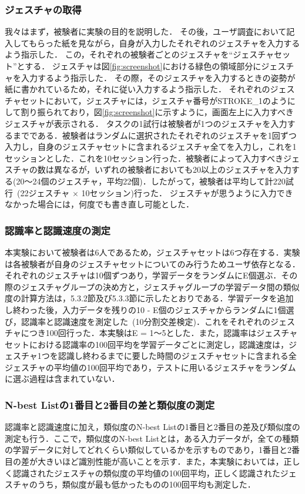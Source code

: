 \subsubsection{ジェスチャの取得}
我々はまず，被験者に実験の目的を説明した．
その後，ユーザ調査において記入してもらった紙を見ながら，自身が入力したそれぞれのジェスチャを入力するよう指示した．
この，それぞれの被験者ごとのジェスチャを``ジェスチャセット''とする．
ジェスチャは図\ref{fig:screenshot}における緑色の領域部分にジェスチャを入力するよう指示した．
その際，そのジェスチャを入力するときの姿勢が紙に書かれているため，それに従い入力するよう指示した．
それぞれのジェスチャセットにおいて，ジェスチャには，ジェスチャ番号がSTROKE\_1のようにして割り振られており，図\ref{fig:screenshot}に示すように，画面左上に入力すべきジェスチャが表示される．
タスクの1試行は被験者が1つのジェスチャを入力するまでである．被験者はランダムに選択されたそれぞれのジェスチャを1回ずつ入力し，自身のジェスチャセットに含まれるジェスチャ全てを入力し，これを1セッションとした．これを10セッション行った．被験者によって入力すべきジェスチャの数は異なるが，いずれの被験者においても20以上のジェスチャを入力する(20〜24個のジェスチャ，平均22個)．したがって，被験者は平均して計220試行~(22ジェスチャ $\times$ 10セッション)行った．
ジェスチャが思うように入力できなかった場合には，何度でも書き直し可能とした．

\subsubsection{認識率と認識速度の測定}
本実験において被験者は6人であるため，ジェスチャセットは6つ存在する．実験は各被験者が自身のジェスチャセットについてのみ行うためユーザ依存となる．それぞれのジェスチャは10個ずつあり，学習データをランダムにE個選ぶ．その際のジェスチャグループの決め方と，ジェスチャグループの学習データ間の類似度の計算方法は，5.3.2節及び5.3.3節に示したとおりである．学習データを追加し終わった後，入力データを残りの10 - E個のジェスチャからランダムに1個選び，認識率と認識速度を測定した~(10分割交差検定)．これをそれぞれのジェスチャにつき100回行った．本実験はE = 1〜5とした．また，認識率はジェスチャセットにおける認識率の100回平均を学習データごとに測定し，認識速度は，ジェスチャ1つを認識し終わるまでに要した時間のジェスチャセットに含まれる全ジェスチャの平均値の100回平均であり，テストに用いるジェスチャをランダムに選ぶ過程は含まれていない．

\subsubsection{N-best Listの1番目と2番目の差と類似度の測定}
認識率と認識速度に加え，類似度のN-best Listの1番目と2番目の差及び類似度の測定も行う．ここで，類似度のN-best Listとは，ある入力データが，全ての種類の学習データに対してどれくらい類似しているかを示すものであり，1番目と2番目の差が大きいほど識別性能が高いことを示す．また，本実験においては，正しく認識されたジェスチャの類似度の平均値の100回平均，正しく認識されたジェスチャのうち，類似度が最も低かったものの100回平均も測定した．


